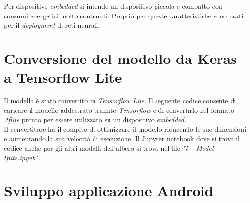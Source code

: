 Per dispositivo \textit{embedded} si intende un dispositivo piccolo e compatto con consumi energetici molto contenuti. Proprio per queste caratteristiche sono usati per il \textit{deployment} di reti neurali.

\section{Conversione del modello da Keras a Tensorflow Lite}
Il modello è stato convertito in \textit{Tensorflow Lite}. Il seguente codice consente di caricare il modello addestrato tramite \textit{Tensorflow} e di convertirlo nel formato .\textit{tflite} pronto per essere utilizzato su un dispositivo \textit{embedded}.\\
\newline Il convertitore ha il compito di ottimizzare il modello riducendo le sue dimensioni e aumentando la sua velocità di esecuzione.
\vspace*{2ex}
\noindent Il Jupyter notebook dove si trova il codice anche per gli altri modelli dell'albero si trova nel file \textit{"5 - Model tflite.ipynb"}.

\section{Sviluppo applicazione Android}
